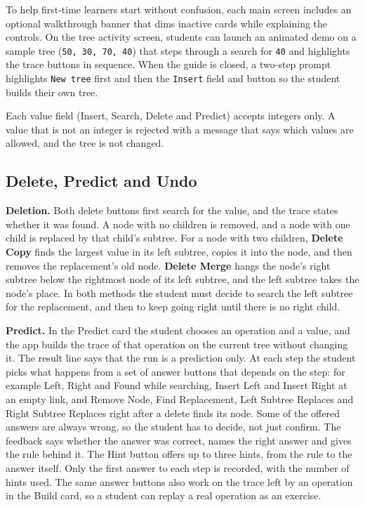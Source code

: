 To help first-time learners start without confusion, each main screen includes an optional walkthrough banner that dims inactive cards while explaining the controls. On the tree activity screen, students can launch an animated demo on a sample tree (\texttt{50, 30, 70, 40}) that steps through a search for \texttt{40} and highlights the trace buttons in sequence. When the guide is closed, a two-step prompt highlights \texttt{New tree} first and then the \texttt{Insert} field and button so the student builds their own tree.

Each value field (Insert, Search, Delete and Predict) accepts integers only. A value that is not an integer is rejected with a message that says which values are allowed, and the tree is not changed.

\subsection{Delete, Predict and Undo}
\textbf{Deletion.} Both delete buttons first search for the value, and the trace states whether it was found. A node with no children is removed, and a node with one child is replaced by that child's subtree. For a node with two children, \textbf{Delete Copy} finds the largest value in its left subtree, copies it into the node, and then removes the replacement's old node. \textbf{Delete Merge} hangs the node's right subtree below the rightmost node of its left subtree, and the left subtree takes the node's place. In both methods the student must decide to search the left subtree for the replacement, and then to keep going right until there is no right child.

\textbf{Predict.} In the Predict card the student chooses an operation and a value, and the app builds the trace of that operation on the current tree without changing it. The result line says that the run is a prediction only. At each step the student picks what happens from a set of answer buttons that depends on the step: for example Left, Right and Found while searching, Insert Left and Insert Right at an empty link, and Remove Node, Find Replacement, Left Subtree Replaces and Right Subtree Replaces right after a delete finds its node. Some of the offered answers are always wrong, so the student has to decide, not just confirm. The feedback says whether the answer was correct, names the right answer and gives the rule behind it. The Hint button offers up to three hints, from the rule to the answer itself. Only the first answer to each step is recorded, with the number of hints used. The same answer buttons also work on the trace left by an operation in the Build card, so a student can replay a real operation as an exercise.

